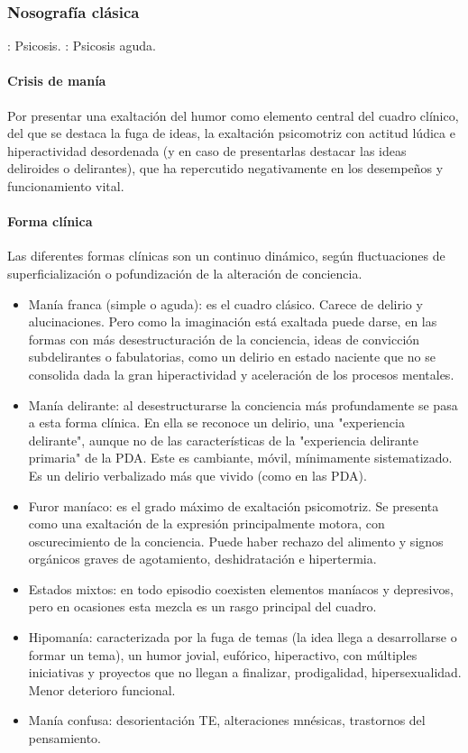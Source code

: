 \subsubsection*{Nosografía clásica}
\faPaste: Psicosis.
\faPaste: Psicosis aguda.
\paragraph{Crisis de manía}
Por presentar una exaltación del humor como elemento central del cuadro clínico, del que se destaca la fuga de ideas, la exaltación psicomotriz con actitud lúdica e hiperactividad desordenada (y en caso de presentarlas destacar las ideas deliroides o delirantes), que ha repercutido negativamente en los desempeños y funcionamiento vital.
\paragraph{Forma clínica}
Las diferentes formas clínicas son un continuo dinámico, según fluctuaciones de superficialización o pofundización de la alteración de conciencia.
\begin{itemize}
	\item Manía franca (simple o aguda): es el cuadro clásico. Carece de delirio y alucinaciones. Pero como la imaginación está exaltada puede darse, en las formas con más desestructuración de la conciencia, ideas de convicción subdelirantes o fabulatorias, como un delirio en estado naciente que no se consolida dada la gran hiperactividad y aceleración de los procesos mentales.
	\item Manía delirante: al desestructurarse la conciencia más profundamente se pasa a esta forma clínica. En ella se reconoce un delirio, una "experiencia delirante", aunque no de las características de la "experiencia delirante primaria" de la PDA. Este es cambiante, móvil, mínimamente sistematizado. Es un delirio verbalizado más que vivido (como en las PDA).
	\item Furor maníaco: es el grado máximo de exaltación psicomotriz. Se presenta como una exaltación de la expresión principalmente motora, con oscurecimiento de la conciencia. Puede haber rechazo del alimento y signos orgánicos graves de agotamiento, deshidratación e hipertermia.
	\item Estados mixtos: en todo episodio coexisten elementos maníacos y depresivos, pero en ocasiones esta mezcla es un rasgo principal del cuadro.
	\item Hipomanía: caracterizada por la fuga de temas (la idea llega a desarrollarse o formar un tema), un humor jovial, eufórico, hiperactivo, con múltiples iniciativas y proyectos que no llegan a finalizar, prodigalidad, hipersexualidad. Menor deterioro funcional.
	\item Manía confusa: desorientación TE, alteraciones mnésicas, trastornos del pensamiento.
\end{itemize}
